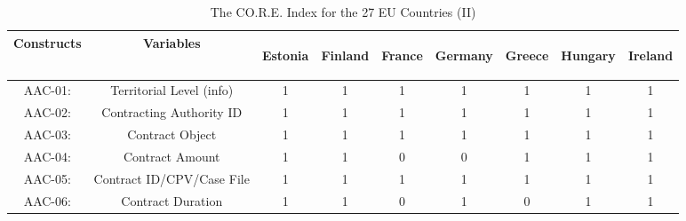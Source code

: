 \documentclass[a4paper, twoside]{report}
\begin{document}
\begin{table}[htbp]
  \centering
  \caption{The CO.R.E. Index for the 27 EU Countries (II)}
   \tabcolsep=0.80cm
	\renewcommand{\arraystretch}{0.95}
	\begin{adjustbox}{max width=\linewidth}
        \begin{tabular}{rcccccccc}
    \multicolumn{1}{c}{Constructs} & Variables & \multicolumn{1}{l}{\begin{sideways}Estonia\end{sideways}} & \multicolumn{1}{l}{\begin{sideways}Finland\end{sideways}} & \multicolumn{1}{l}{\begin{sideways}France\end{sideways}} & \multicolumn{1}{l}{\begin{sideways}Germany\end{sideways}} & \multicolumn{1}{l}{\begin{sideways}Greece\end{sideways}} & \multicolumn{1}{l}{\begin{sideways}Hungary\end{sideways}} & \multicolumn{1}{l}{\begin{sideways}Ireland\end{sideways}} \\
    \midrule
    \multicolumn{1}{c}{AAC-01:} & \multicolumn{1}{p{19em}}{Territorial Level (info)} & 1     & 1     & 1     & 1     & 1     & 1     & 1 \\
    \multicolumn{1}{c}{AAC-02:} & \multicolumn{1}{p{19em}}{Contracting Authority ID} & 1     & 1     & 1     & 1     & 1     & 1     & 1 \\
    \multicolumn{1}{c}{AAC-03:} & \multicolumn{1}{p{19em}}{Contract Object} & 1     & 1     & 1     & 1     & 1     & 1     & 1 \\
    \multicolumn{1}{c}{AAC-04:} & \multicolumn{1}{p{19em}}{Contract Amount} & 1     & 1     & 0     & 0     & 1     & 1     & 1 \\
    \multicolumn{1}{c}{AAC-05:} & \multicolumn{1}{p{19em}}{Contract ID/CPV/Case File} & 1     & 1     & 1     & 1     & 1     & 1     & 1 \\
    \multicolumn{1}{c}{AAC-06:} & \multicolumn{1}{p{19em}}{Contract Duration} & 1     & 1     & 0     & 1     & 0     & 1     & 1 \\

\end{tabular}
\end{adjustbox}
\end{table}
\end{document}
